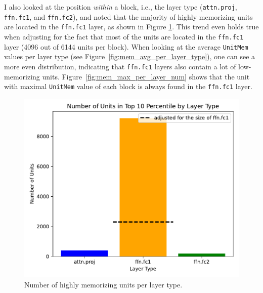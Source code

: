 \documentclass{article} %
\begin{document}
I also looked at the position \textit{within} a block, i.e., the layer type (\texttt{attn.proj}, \texttt{ffn.fc1}, and \texttt{ffn.fc2}), and noted that the majority of highly memorizing units are located in the \texttt{ffn.fc1} layer, as shown in Figure \ref{fig:mem_units_per_layer_type}.
This trend even holds true when adjusting for the fact that most of the units are located in the \texttt{ffn.fc1} layer (4096 out of 6144 units per block).
When looking at the average \texttt{UnitMem} values per layer type (see Figure~\ref{fig:mem_avg_per_layer_type}), one can see a more even distribution, indicating that \texttt{ffn.fc1} layers also contain a lot of low-memorizing units.
Figure~\ref{fig:mem_max_per_layer_num} shows that the unit with maximal \texttt{UnitMem} value of each block is always found in the \texttt{ffn.fc1} layer.
\begin{figure}[ht]
   \centering
   \begin{minipage}{0.48\textwidth}
      \centering
      \includegraphics[width=\textwidth]{figures/mem_units_per_layer_type.pdf}
      \caption{Number of highly memorizing units per layer type.}
      \label{fig:mem_units_per_layer_type}
   \end{minipage}\hfill
   \begin{minipage}{0.48\textwidth}
      \centering

\end{minipage}
\end{figure}
\end{document}
